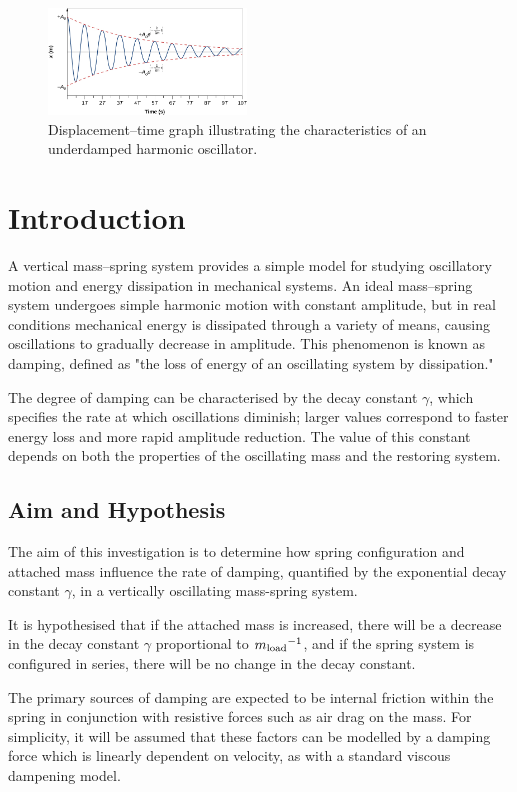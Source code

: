 \begin{figure}
    \centering
    \includegraphics[width=0.47\textwidth]{images/damped_shm.png}
    \caption{Displacement--time graph illustrating the characteristics of an underdamped harmonic oscillator.}
\end{figure}

\section{Introduction}

A vertical mass--spring system provides a simple model for studying oscillatory motion and energy dissipation in mechanical systems. An ideal mass--spring system undergoes simple harmonic motion with constant amplitude, but in real conditions mechanical energy is dissipated through a variety of means, causing oscillations to gradually decrease in amplitude. This phenomenon is known as damping, defined as "the loss of energy of an oscillating system by dissipation."

The degree of damping can be characterised by the decay constant $\gamma$, which specifies the rate at which oscillations diminish; larger values correspond to faster energy loss and more rapid amplitude reduction. The value of this constant depends on both the properties of the oscillating mass and the restoring system.

\subsection{Aim and Hypothesis}
The aim of this investigation is to determine how spring configuration and attached mass influence the rate of damping, quantified by the exponential decay constant $\gamma$, in a vertically oscillating mass-spring system.

It is hypothesised that if the attached mass is increased, there will be a decrease in the decay constant $\gamma$ proportional to $m{\textsubscript{load}}^{-1}$, and if the spring system is configured in series, there will be no change in the decay constant.

The primary sources of damping are expected to be internal friction within the spring in conjunction with resistive forces such as air drag on the mass. For simplicity, it will be assumed that these factors can be modelled by a damping force which is linearly dependent on velocity, as with a standard viscous dampening model.

